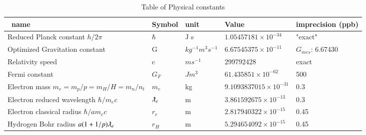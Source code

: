 \documentclass[a4paper,9pt]{article}
\newcounter{col}
\begin{document}
\begin{table}
\begin{tabular}{llll}
    
         
   \bottomrule
  \end{tabular}
\end{table}
 
 
 \begin{table}
\caption[Table \ref{tab:3:table3}: Physical constants]{Table of Physical constants}
\label{tab:3:table3}
  \hskip-2.0cm\begin{tabular}{lllll}
    \toprule
    \cmidrule(r){1-5}
    \ name & Symbol  & unit  & Value & imprecision (ppb) \\
    \midrule
  
 
 Reduced Planck constant $h/2\pi$    & $\hbar$   & J s   & $1.05457181 \times 10^{-34}$ & "exact" \\
 Optimized Gravitation constant   & G & $kg^{-1} m^3 s^{-1}$  & $6.67545375\times 10^{-11}$  & \cite{Sanchez2} $G_{mes}$: 6.67430 \\
 Relativity speed     & c   & $m s^{-1}$   & 299792428 & exact \\
 Fermi constant  & $G_F$ & $J m^3$   & $61.435851 \times 10^{-62}$  &  500\\
 Electron mass $m_e = m_p/p = m_H/H = m_n/n_t$  & $m_e$ & kg  & $9.1093837015 \times 10^{-31}$  &  0.3\\
 Electron reduced wavelength $\hbar/m_ec$ & $\lambdabar_e$ &  m   & $3.861592675\times 10^{-13}$  & 0.3\\
 Electron classical radius $\hbar/am_ec$ & $r_e$ &  m   & $2.817940322\times 10^{-15}$  & 0.45\\
 Hydrogen Bohr radius $a(1+1/p)\lambdabar_e$ & $r_H$ &  m   & $5.294654092 \times 10^{-15}$  & 0.45\\
 
 
 
 

\end{tabular}
\end{table}
\end{document}
